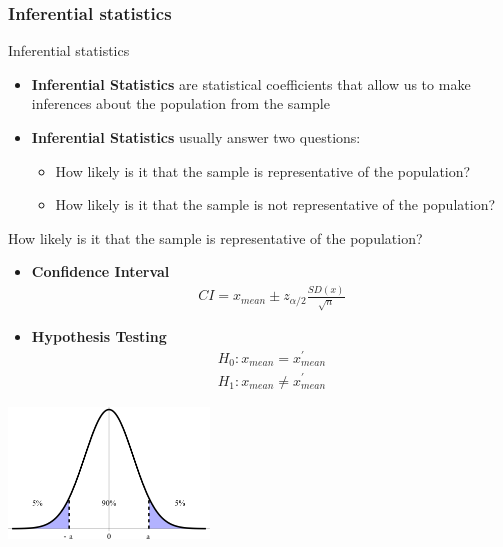 \documentclass{beamer}
\begin{document}
    \subsubsection{Inferential statistics}
    \begin{frame}{Inferential statistics}
        \begin{itemize}
            \item \textbf{Inferential Statistics} are statistical coefficients that allow us to make inferences about the population from the sample
            \item \textbf{Inferential Statistics} usually answer two questions:
            \begin{itemize}
                \item How likely is it that the sample is representative of the population?
                \item How likely is it that the sample is not representative of the population?
            \end{itemize}
        \end{itemize}
    \end{frame}
    \begin{frame}{How likely is it that the sample is representative of the population?}
        \begin{itemize}
            \item \textbf{Confidence Interval}
            \begin{align*}
                CI = x_{mean} \pm z_{\alpha/2}\frac{SD(x)}{\sqrt{n}}
            \end{align*}
            \item \textbf{Hypothesis Testing}
            \begin{align*}
                H_{0}: x_{mean} = x_{mean}^{\prime}\\
                H_{1}: x_{mean} \neq x_{mean}^{\prime}
            \end{align*}
        \end{itemize}
        \begin{center}
            \includegraphics[width=0.4\textwidth]{figures/CI.png}
        \end{center}
    \end{frame}
\end{document}
